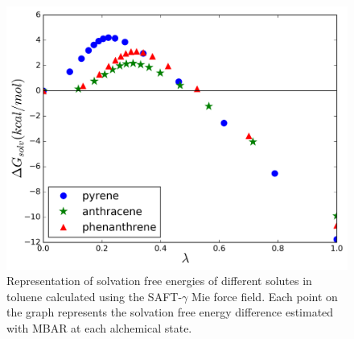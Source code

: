 \documentclass[preprint]{elsarticle}
\begin{document}
	\begin{figure}
		\centering
		\includegraphics[width=1.0\linewidth]{Figures/tolart}
		\caption{Representation of solvation free energies of different solutes in toluene calculated using the SAFT-$\gamma$ Mie force field. Each point on the graph represents the solvation free energy difference estimated with MBAR at each alchemical state. }
		\label{fig:tol}
	\end{figure}
	
\end{document}
